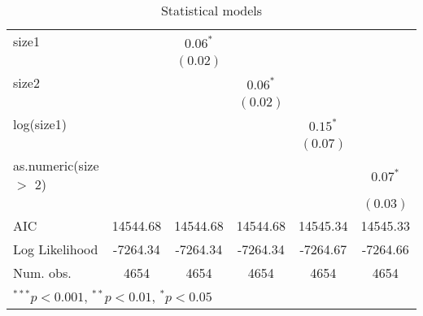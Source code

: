 \begin{table}
\begin{center}
\begin{tabular}{l c c c c c }
size1                  &               & $0.06^{*}$    &               &               &               \\
                       &               & $(0.02)$      &               &               &               \\
size2                  &               &               & $0.06^{*}$    &               &               \\
                       &               &               & $(0.02)$      &               &               \\
log(size1)             &               &               &               & $0.15^{*}$    &               \\
                       &               &               &               & $(0.07)$      &               \\
as.numeric(size $>$ 2) &               &               &               &               & $0.07^{*}$    \\
                       &               &               &               &               & $(0.03)$      \\
\hline
AIC                    & 14544.68      & 14544.68      & 14544.68      & 14545.34      & 14545.33      \\
Log Likelihood         & -7264.34      & -7264.34      & -7264.34      & -7264.67      & -7264.66      \\
Num. obs.              & 4654          & 4654          & 4654          & 4654          & 4654          \\
\hline
\multicolumn{6}{l}{\scriptsize{$^{***}p<0.001$, $^{**}p<0.01$, $^*p<0.05$}}
\end{tabular}
\caption{Statistical models}
\label{table:coefficients}
\end{center}
\end{table}
